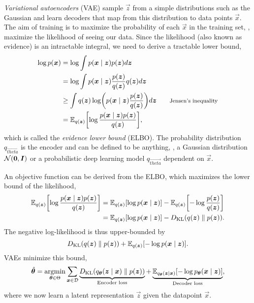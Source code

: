 \textit{Variational autoencoders} (VAE) \citep{kingma2013auto} sample $\vec{z}$
from a simple distributions such as the Gaussian and learn decoders that map
from this distribution to data points $\vec{x}$. The aim of training is to
maximize the probability of each $\vec{x}$ in the training set, \ie, maximize the
likelihood of seeing our data. Since the likelihood (also known as evidence) is
an intractable integral, we need to derive a tractable lower bound,
\begin{align*}
  \log p(\vec{x}) &= \log \int p(\vec{x}\mid\vec{z}) p(\vec{z}) d\vec{z} \\
  &= \log \int p(\vec{x}\mid\vec{z}) \frac{p(\vec{z})}{q(\vec{z})}q(\vec{z}) d\vec{z} \\
  &\geq \int q(\vec{z})\log \lft( p(\vec{x}\mid\vec{z})\frac{p(\vec{z})}{q(\vec{z})} \rgt) d\vec{z} & \text{\footnotesize Jensen's inequality} \\
  &= \E_{q(\vec{z})}\lft[ \log \frac{p(\vec{x}\mid\vec{z})p(\vec{z})}{q(\vec{z})} \rgt]
,\end{align*}
which is called the \textit{evidence lower bound} (ELBO). The probability
distribution $q_{\vec{theta}}$ is the encoder and can be defined to be
anything, \eg, a Gaussian distribution $\mathcal{N}(\bm{0},\bm{I})$ or a
probabilistic deep learning model $q_{\vec{theta}}$ dependent on $\vec{x}$.

An objective function can be derived from the ELBO, which maximizes the lower
bound of the likelihood,
\begin{align*}
  \E_{q(\vec{z})}\lft[ \log \frac{p(\vec{x}\mid\vec{z})p(\vec{z})}{q(\vec{z})} \rgt] &= \E_{q(\vec{z})} \lft[ \log p(\vec{x}\mid\vec{z}) \rgt] - \E_{q(\vec{z})} \lft[ -\log \frac{p(\vec{z})}{q(\vec{z})} \rgt] \\
  &= \E_{q(\vec{z})} \lft[ \log p(\vec{x}\mid\vec{z}) \rgt] - D_{\mathrm{KL}} (q(\vec{z}) \mathrel{\Vert} p(\vec{z}))
.\end{align*}
The negative log-likelihood is thus upper-bounded by \[
  D_{\mathrm{KL}}(q(\bm{z})\mathrel{\Vert}p(\bm{z})) + \mathbb{E}_{q(\bm{z})} [-\log p(\bm{x}\mid\bm{z})]
.\]
VAEs minimize this bound, \[
  \hat{\bm{\theta}} = \operatorname*{argmin}_{\bm{\theta}\in\Theta} \sum_{\bm{x}\in\mathcal{D}} \underbrace{D_{\mathrm{KL}}(q_{\bm{\theta}}(\bm{z}\mid\bm{x})\mathrel{\Vert}p(\bm{z}))}_{\text{Encoder loss}} + \underbrace{\mathbb{E}_{q_{\bm{\theta}}(\bm{z}\mid\bm{x})} [-\log p_{\bm{\theta}}(\bm{x}\mid\bm{z})]}_{\text{Decoder loss}}
,\]
where we now learn a latent representation $\vec{z}$ given the datapoint
$\vec{x}$.

